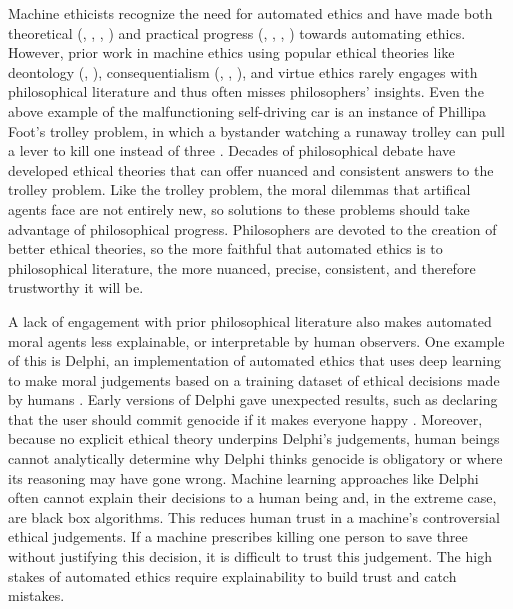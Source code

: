 \begin{isabellebody}
\begin{isamarkuptext}
Machine ethicists recognize the need for automated ethics and have made both theoretical 
(\citep{moralmachineonline}, \citep{davenport}, \citep{moralmachine}, \citep{gabriel}) and practical progress 
(\citep{logicprogramming}, \citep{biology}, \citep{delphi}, \citep{winfield}) towards automating ethics. 
However, prior work in machine ethics using popular ethical theories like deontology (\citep{deon2}, \citep{deon1}), 
consequentialism (\citep{util1}, \citep{util2}, \citep{cloos}), and virtue ethics \citep{virtue2} rarely 
engages with philosophical literature and thus often misses philosophers' insights. Even the above example of 
the malfunctioning self-driving car is an instance of Phillipa Foot's trolley problem, 
in which a bystander watching a runaway trolley can pull a lever to kill one instead of three \citep{foot}. 
Decades of philosophical debate have developed ethical theories that can offer nuanced and 
consistent answers to the trolley problem. Like the trolley problem, the moral dilemmas 
that artifical agents face are not entirely new, so solutions to these problems should take advantage of philosophical 
progress. Philosophers are devoted to the creation of better ethical theories, so the 
more faithful that automated ethics is to philosophical literature, the more nuanced, precise, consistent, and
therefore trustworthy it will be.

A lack of engagement with prior philosophical literature also makes automated moral agents less 
explainable, or interpretable by human observers. One example of this is Delphi, an implementation of automated ethics that uses deep 
learning to make moral judgements based on a training dataset of ethical decisions made by humans \citep{delphi}. 
Early versions of Delphi gave unexpected results, such as declaring that the user should commit 
genocide if it makes everyone happy \citep{verge}. Moreover, because no explicit ethical theory underpins 
Delphi's judgements, human beings cannot analytically determine why Delphi thinks genocide is obligatory
or where its reasoning may have gone wrong. 
Machine learning approaches like Delphi often cannot explain their decisions to a human being and, 
in the extreme case, are black box algorithms. This reduces human trust in a machine's controversial 
ethical judgements. If a machine prescribes killing one person to save three without justifying this 
decision, it is difficult to trust this judgement. 
The high stakes of automated ethics require explainability to build trust and catch mistakes. 


\end{isamarkuptext}
\end{isabellebody}
